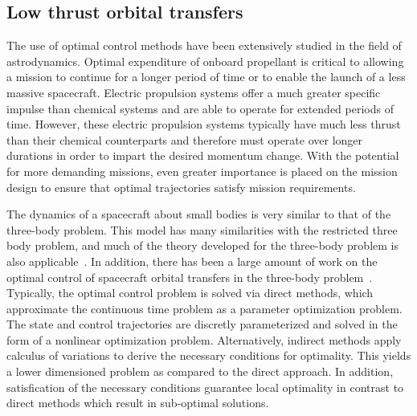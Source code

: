 \subsection{Low thrust orbital transfers}

The use of optimal control methods have been extensively studied in the field of astrodynamics.
Optimal expenditure of onboard propellant is critical to allowing a mission to continue for a longer period of time or to enable the launch of a less massive spacecraft.
Electric propulsion systems offer a much greater specific impulse than chemical systems and are able to operate for extended periods of time.
However, these electric propulsion systems typically have much less thrust than their chemical counterparts and therefore must operate over longer durations in order to impart the desired momentum change.
With the potential for more demanding missions, even greater importance is placed on the mission design to ensure that optimal trajectories satisfy mission requirements. 

The dynamics of a spacecraft about small bodies is very similar to that of the three-body problem.
This model has many similarities with the restricted three body problem, and much of the theory developed for the three-body problem is also applicable~\cite{mondelo2010,herrera2014}.
In addition, there has been a large amount of work on the optimal control of spacecraft orbital transfers in the three-body problem~\cite{mingotti2011,grebow2011}.
Typically, the optimal control problem is solved via direct methods, which approximate the continuous time problem as a parameter optimization problem.
The state and control trajectories are discretly parameterized and solved in the form of a nonlinear optimization problem.
Alternatively, indirect methods apply calculus of variations to derive the necessary conditions for optimality. 
This yields a lower dimensioned problem as compared to the direct approach.
In addition, satisfication of the necessary conditions guarantee local optimality in contrast to direct methods which result in sub-optimal solutions.


